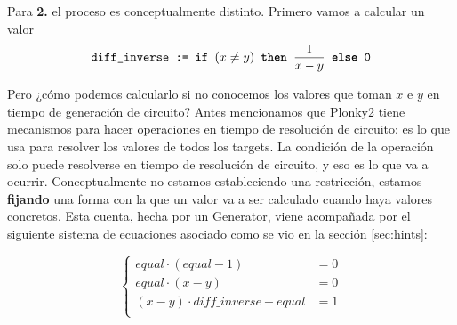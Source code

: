 Para \textbf{2.} el proceso es conceptualmente distinto. Primero vamos a calcular un valor 
\[
\texttt{
	diff\_inverse := \textbf{if} $(x \neq y)$ \textbf{then} $\frac{1}{x-y}$  \textbf{else} 0
}
\]


Pero ¿cómo podemos calcularlo si no conocemos los valores que toman $x$ e $y$ en tiempo de generación de circuito? Antes mencionamos que Plonky2 tiene mecanismos para hacer operaciones en tiempo de resolución de circuito: es lo que usa para resolver los valores de todos los targets. La condición de la operación solo puede resolverse en tiempo de resolución de circuito, y eso es lo que va a ocurrir. Conceptualmente no estamos estableciendo una restricción, estamos \textbf{fijando} una forma con la que un valor va a ser calculado cuando haya valores concretos. Esta cuenta, hecha por un Generator, viene acompañada por el siguiente sistema de ecuaciones asociado como se vio en la sección \ref{sec:hints}:
\begin{figure}[H]
	\centering
	\begin{minipage}[c]{0.6\textwidth}
		\centering
		\[
		\left\{
		\begin{array}{rl}
			equal \cdot (equal - 1) &= 0 \\
			equal \cdot (x - y) &= 0 \\
			(x - y) \cdot diff\_inverse + equal &= 1 \\
		\end{array}
		\right.
		\]
	\end{minipage}
\end{figure}

